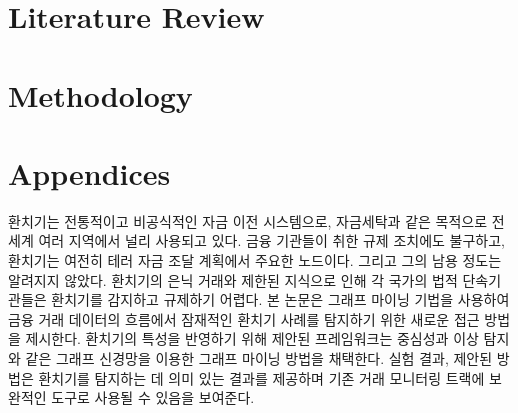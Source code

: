 \documentclass[11pt,jaso]{pnumasterh}
\begin{document}
\section{Literature Review} \label{literature_review}

\clearpage

\section{Methodology}
\clearpage

% 


\nocite{*}


\clearpage

\appendix
\section*{Appendices}

\clearpage

\begin{eabstract}
환치기는 전통적이고 비공식적인 자금 이전 시스템으로, 자금세탁과 같은 목적으로 전 세계 여러 지역에서 널리 사용되고 있다. 금융 기관들이 취한 규제 조치에도 불구하고, 환치기는 여전히 테러 자금 조달 계획에서 주요한 노드이다. 그리고 그의 남용 정도는 알려지지 않았다. 환치기의 은닉 거래와 제한된 지식으로 인해 각 국가의 법적 단속기관들은 환치기를 감지하고 규제하기 어렵다. 본 논문은 그래프 마이닝 기법을 사용하여 금융 거래 데이터의 흐름에서 잠재적인 환치기 사례를 탐지하기 위한 새로운 접근 방법을 제시한다. 환치기의 특성을 반영하기 위해 제안된 프레임워크는 중심성과 이상 탐지와 같은 그래프 신경망을 이용한 그래프 마이닝 방법을 채택한다. 실험 결과, 제안된 방법은 환치기를 탐지하는 데 의미 있는 결과를 제공하며 기존 거래 모니터링 트랙에 보완적인 도구로 사용될 수 있음을 보여준다.	
\end{eabstract}

%
\end{document}
